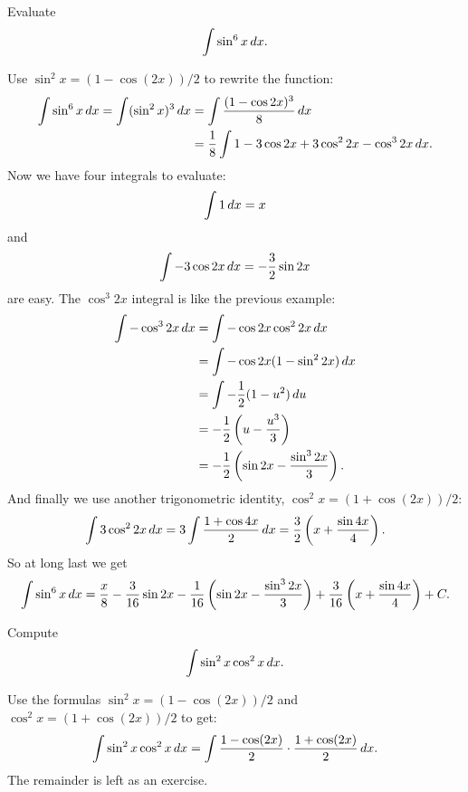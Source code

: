 \begin{example}
Evaluate 
\[
\int \sin^6 x\, d x.
\]
\end{example}

\begin{solution}
Use $\sin^2x =(1-\cos(2x))/2$ to rewrite the function:
\begin{align*}
  \int \sin^6 x\, d x=\int (\sin^2 x)^3\, d x&=
  \int {(1-\cos 2x)^3\over 8}\, d x \\
  &={1\over 8}\int 1-3\cos 2x+3\cos^2 2x-\cos^3 2x\, d x.
\end{align*}
Now we have four integrals to evaluate:
$$\int 1\, d x=x$$
and
$$\int -3\cos 2x\, d x = -{3\over 2}\sin 2x$$
are easy. The $\cos^3 2x$ integral is like the previous example:
\begin{align*}
  \int -\cos^3 2x\, d x&=\int -\cos 2x\cos^2 2x\, d x \\
  &=\int -\cos 2x(1-\sin^2 2x)\, d x \\
  &=\int -{1\over 2}(1-u^2)\, d u \\
  &=-{1\over 2}\left(u-{u^3\over 3}\right) \\
  &=-{1\over 2}\left(\sin 2x-{\sin^3 2x\over 3}\right).
\end{align*}
And finally we use another trigonometric identity,
$\cos^2x=(1+\cos(2x))/2$:
$$
  \int 3\cos^2 2x\, d x=3\int {1+\cos 4x\over 2}\, d x=
  {3\over 2}\left(x+{\sin 4x\over 4}\right).
$$
So at long last we get
$$
  \int \sin^6 x\, d x = {x\over8} -{3\over 16}\sin 2x 
  -{1\over 16}\left(\sin 2x-{\sin^3 2x\over 3}\right)
  +{3\over 16}\left(x+{\sin 4x\over 4}\right)+C.
$$
\end{solution}

\begin{example}
Compute 
\[
\int \sin^2x\cos^2x\, d x.
\]
\end{example}
\begin{solution} 
Use the formulas
$\sin^2x =(1-\cos(2x))/2$ and $\cos^2x =(1+\cos(2x))/2$ to get:
$$
  \int \sin^2x\cos^2x\, d x=\int {1-\cos(2x)\over2}\cdot
  {1+\cos(2x)\over2}\, d x.
$$
The remainder is left as an exercise.
\end{solution}

